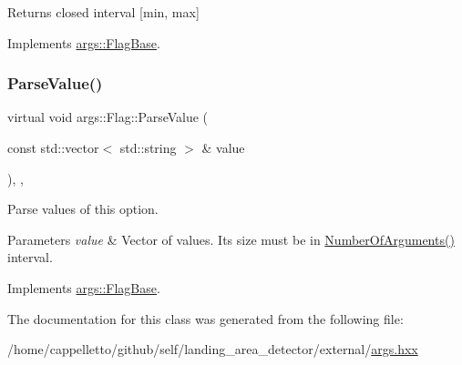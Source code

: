 \begin{DoxyReturn}{Returns}
closed interval \mbox{[}min, max\mbox{]} 
\end{DoxyReturn}


Implements \hyperlink{classargs_1_1_flag_base_a6007ffeaa767893cb8eff5333d61673b}{args\+::\+Flag\+Base}.

\mbox{\label{classargs_1_1_flag_a48ce8c59b554db36d2869b24b56c94dd}} 
\subsubsection{\texorpdfstring{Parse\+Value()}{ParseValue()}}
{\footnotesize\ttfamily virtual void args\+::\+Flag\+::\+Parse\+Value (\begin{DoxyParamCaption}\item[{const std\+::vector$<$ std\+::string $>$ \&}]{value }\end{DoxyParamCaption})\hspace{0.3cm}{\ttfamily [inline]}, {\ttfamily [override]}, {\ttfamily [virtual]}}

Parse values of this option.


\begin{DoxyParams}{Parameters}
{\em value} & Vector of values. It\textquotesingle{}s size must be in \hyperlink{classargs_1_1_flag_a1bd707628d2987d3ccf2dbdb810302e4}{Number\+Of\+Arguments()} interval. \\
\hline
\end{DoxyParams}


Implements \hyperlink{classargs_1_1_flag_base_a3421d9a595c9426dc73f62604cdee84f}{args\+::\+Flag\+Base}.



The documentation for this class was generated from the following file\+:\begin{DoxyCompactItemize}
\item 
/home/cappelletto/github/self/landing\+\_\+area\+\_\+detector/external/\hyperlink{args_8hxx}{args.\+hxx}\end{DoxyCompactItemize}

